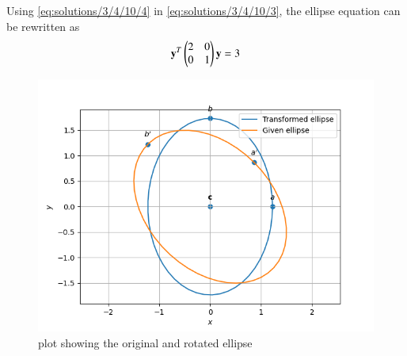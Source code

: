 Using \eqref{eq:solutions/3/4/10/4} in \eqref{eq:solutions/3/4/10/3}, the ellipse equation can be rewritten as
\begin{align}
     \mathbf{y}^T\begin{pmatrix}2&0\\0&1\end{pmatrix}\mathbf{y}=3
\end{align}
\begin{figure}[!ht]
\centering
\includegraphics[width=\columnwidth]{./solutions/3/4/10/plot.png}
\caption{plot showing the original and rotated ellipse}
\label{eq:solutions/3/4/10/Fig}
\end{figure}


